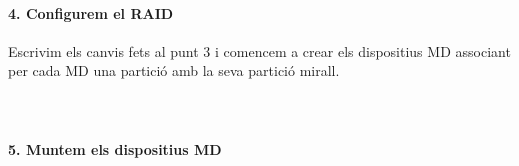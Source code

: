 \documentclass[a4paper]{article}
\begin{document}
\paragraph{4. Configurem el RAID \\}
Escrivim els canvis fets al punt 3 i comencem a crear els dispositius MD associant per cada MD una partició amb la seva partició mirall.\\
 \\
 \\
\paragraph{5. Muntem els dispositius MD \\}
 \\
\end{document}
